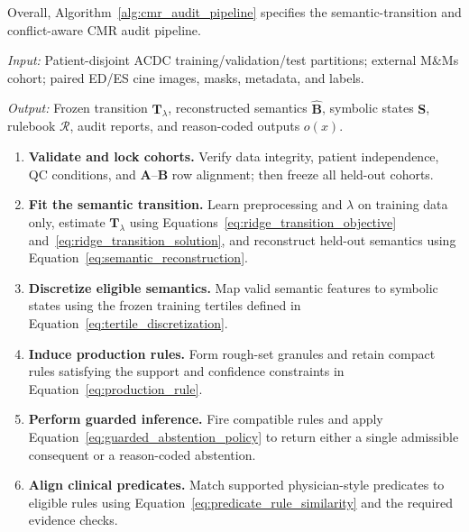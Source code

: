 \documentclass{ceurart}
\newcommand{\matA}{\mathbf{A}}
\newcommand{\matB}{\mathbf{B}}
\newcommand{\hatB}{\widehat{\mathbf{B}}}
\newcommand{\matT}{\mathbf{T}}
\newcommand{\matS}{\mathbf{S}}
\newcommand{\Rule}{\mathcal{R}}
\begin{document}
Overall, Algorithm~\ref{alg:cmr_audit_pipeline} specifies the semantic-transition and conflict-aware CMR audit pipeline.

\begin{algorithm}[!htbp]
\caption{Semantic-transition and conflict-aware CMR audit pipeline}
\label{alg:cmr_audit_pipeline}

\textit{Input:} Patient-disjoint ACDC training/validation/test partitions; 
external M\&Ms cohort; paired ED/ES cine images, masks, metadata, and labels.\par

\textit{Output:} Frozen transition \(\matT_\lambda\), reconstructed semantics 
\(\hatB\), symbolic states \(\matS\), rulebook \(\Rule\), audit reports, 
and reason-coded outputs \(o(x)\).

\begin{enumerate}[leftmargin=*,itemsep=2pt,topsep=2pt]

    \item \textbf{Validate and lock cohorts.}
    Verify data integrity, patient independence, QC conditions, and 
    \(\matA\)--\(\matB\) row alignment; then freeze all held-out cohorts.

    \item \textbf{Fit the semantic transition.}
    Learn preprocessing and \(\lambda\) on training data only, estimate 
    \(\matT_\lambda\) using Equations~\eqref{eq:ridge_transition_objective} 
    and~\eqref{eq:ridge_transition_solution}, and reconstruct held-out 
    semantics using Equation~\eqref{eq:semantic_reconstruction}.

    \item \textbf{Discretize eligible semantics.}
    Map valid semantic features to symbolic states using the frozen 
    training tertiles defined in Equation~\eqref{eq:tertile_discretization}.

    \item \textbf{Induce production rules.}
    Form rough-set granules and retain compact rules satisfying the 
    support and confidence constraints in Equation~\eqref{eq:production_rule}.

    \item \textbf{Perform guarded inference.}
    Fire compatible rules and apply 
    Equation~\eqref{eq:guarded_abstention_policy} to return either a 
    single admissible consequent or a reason-coded abstention.

    \item \textbf{Align clinical predicates.}
    Match supported physician-style predicates to eligible rules using 
    Equation~\eqref{eq:predicate_rule_similarity} and the required 
    evidence checks.


\end{enumerate}
\end{algorithm}
\end{document}
